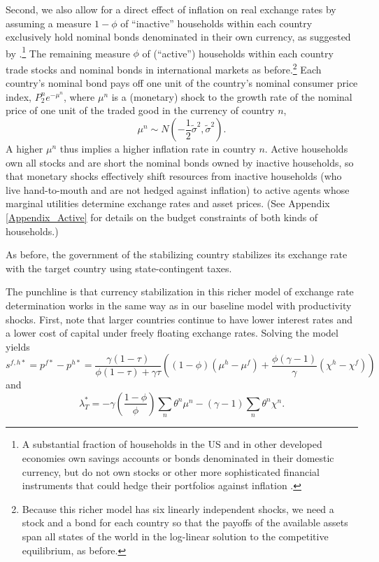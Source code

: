 \documentclass[12pt,letter]{article}
\theoremstyle{break} \theorembodyfont{\normalfont\itshape}
\theoremstyle{break}
\theoremstyle{break} \theorembodyfont{\normalfont\itshape}
\theoremstyle{break} \theorembodyfont{\normalfont\itshape}
\begin{document}
Second, we also allow for a direct effect of inflation on real
exchange rates by assuming a measure $1 - \phi$ of ``inactive''
households within each country exclusively hold nominal bonds
denominated in their own currency, as suggested by
\cite{AlvarezAtkesonKehoe2002}.\footnote{A substantial fraction of
  households in the US and in other developed economies own savings
  accounts or bonds denominated in their domestic currency, but do not
  own stocks or other more sophisticated financial instruments that
  could hedge their portfolios against inflation
  \citep*{Giannetti2010,Nechio2010}. } The remaining measure $\phi$ of
(``active'') households within each country trade stocks and nominal
bonds in international markets as before.\footnote{Because this richer
  model has six linearly independent shocks, we need a stock and a
  bond for each country so that the payoffs of the available assets
  span all states of the world in the log-linear solution to the
  competitive equilibrium, as before.} Each country's nominal bond
pays off one unit of the country's nominal consumer price index,
$P_2^n e^{- \mu^n}$, where $\mu^n$ is a (monetary) shock to the growth
rate of the nominal price of one unit of the traded good in the
currency of country \(n\), \begin{equation*} \mu^n \sim N\left(
    -\frac{1}{2}\tilde{\sigma}^2, \tilde{\sigma}^2 \right).
\end{equation*}
A higher \(\mu^n\) thus implies a higher inflation rate in country
\(n\). Active households own all stocks and are short the nominal
bonds owned by inactive households, so that monetary shocks
effectively shift resources from inactive households (who live
hand-to-mouth and are not hedged against inflation) to active agents
whose marginal utilities determine exchange rates and asset prices.
(See Appendix \ref{Appendix_Active} for details on the budget
constraints of both kinds of households.)

As before, the government of the stabilizing country stabilizes its
exchange rate with the target country using state-contingent taxes.

The punchline is that currency stabilization in this richer model of
exchange rate determination works in the same way as in our baseline
model with productivity shocks. First, note that larger countries
continue to have lower interest rates and a lower cost of capital
under freely floating exchange rates. Solving the model yields
\begin{equation*}
  s^{f, h \ast}
  = p^{f \ast} - p^{h \ast}
  = \frac{\gamma (1 - \tau)}{\phi (1 - \tau) + \gamma \tau}
  \left((1 - \phi) \left( \mu^h - \mu^f \right) +
    \frac{\phi \left( \gamma - 1 \right)}{\gamma}
    \left( \chi^h - \chi^f  \right)
  \right)
\end{equation*}
and
\begin{equation*}
  \lambda_{T}^\ast 
  = 
  - \gamma \left( \frac{1 - \phi}{\phi} \right) \sum_n \theta^n \mu^n 
  - (\gamma - 1)\sum_n \theta^n \chi^n.
\end{equation*}
\end{document}
